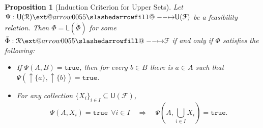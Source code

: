 \documentclass[12pt]{article}
\makeatletter
\theoremstyle{definition}
\theoremstyle{plain}
\theoremstyle{plain}
\newtheorem{proposition}{Proposition}[section]
\theoremstyle{plain}
\theoremstyle{plain}
\theoremstyle{remark}
\theoremstyle{remark}
\newcommand{\mc}[1]{\mathcal{#1}}
\newcommand{\sub}{\subseteq}
\newcommand{\low}{\mathsf{L}}
\newcommand{\upper}{\mathsf{U}}
\newcommand{\true}{\mathtt{true}}
\newcommand{\upc}[1]{{\uparrow #1}}
\def\slashedarrowfill@#1#2#3#4#5{%
	$\m@th\thickmuskip0mu\medmuskip\thickmuskip\thinmuskip\thickmuskip
	\relax#5#1\mkern-7mu%
	\cleaders\hbox{$#5\mkern-2mu#2\mkern-2mu$}\hfill
	\mathclap{#3}\mathclap{#2}%
	\cleaders\hbox{$#5\mkern-2mu#2\mkern-2mu$}\hfill
	\mkern-7mu#4$%
}
\def\rightslashedarrowfill@{%
	\slashedarrowfill@\relbar\relbar\mapstochar\rightarrow}
\newcommand\xslashedrightarrow[2][]{%
	\ext@arrow 0055{\rightslashedarrowfill@}{#1}{#2}}
\makeatother
\begin{document}
\begin{proposition}[Induction Criterion for Upper Sets]\label{prop:induction upper}
	Let $\Psi: \upper(\mc{R}) \xslashedrightarrow{} \upper(\mc{F})$ be a feasibility relation. Then $\Phi = \low(\tilde\Phi)$ for some $\tilde\Phi: \mc{R} \xslashedrightarrow{} \mc{F}$ if and only if $\Phi$ satisfies the following: 
	\begin{itemize}
		\item If $\Psi(A,B)=\true$, then for every $b \in B$ there is $a \in A$ such that $\Psi(\upc{\{a\}},\upc{\{b\}})=\true$.
		\item For any collection $\{X_i\}_{i \in I} \sub \upper(\mc{F})$,
		$$\Psi(A,X_i) = \true \:\: \forall i \in I \quad \Rightarrow \quad \Psi(A,\bigcup_{i \in I} X_i) = \true.$$
	\end{itemize}
\end{proposition} 
\end{document}

